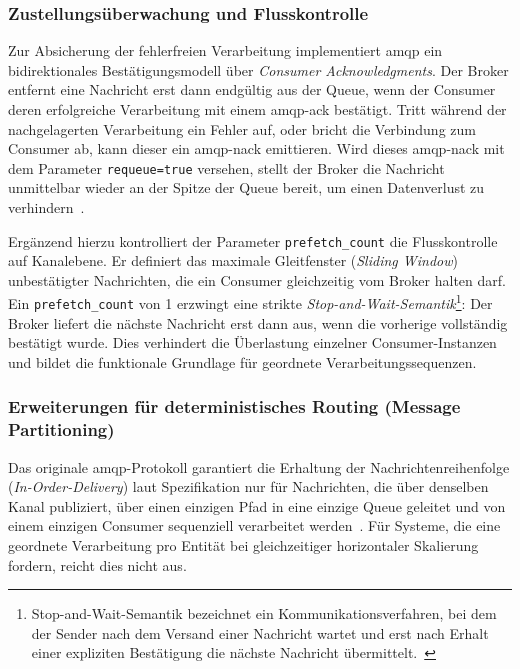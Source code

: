 \subsubsection{Zustellungsüberwachung und Flusskontrolle}

Zur Absicherung der fehlerfreien Verarbeitung implementiert \gls{amqp} ein bidirektionales Bestätigungsmodell über \textit{Consumer Acknowledgments}. Der Broker entfernt eine Nachricht erst dann endgültig aus der Queue, wenn der Consumer deren erfolgreiche Verarbeitung mit einem \gls{amqp}-\gls{ack} bestätigt. Tritt während der nachgelagerten Verarbeitung ein Fehler auf, oder bricht die Verbindung zum Consumer ab, kann dieser ein \gls{amqp}-\gls{nack} emittieren. Wird dieses \gls{amqp}-\gls{nack} mit dem Parameter \texttt{requeue=true} versehen, %
stellt der Broker die Nachricht unmittelbar wieder an der Spitze der Queue bereit, um einen Datenverlust zu verhindern~\citep{oasis2012amqp10}.

Ergänzend hierzu kontrolliert der Parameter \texttt{prefetch\_count} die Flusskontrolle auf Kanalebene. Er definiert das maximale Gleitfenster (\textit{Sliding Window}) unbestätigter Nachrichten, die ein Consumer gleichzeitig vom Broker halten darf. Ein \texttt{prefetch\_count} von 1 erzwingt eine strikte \textit{Stop-and-Wait-Semantik}\footnote{Stop-and-Wait-Semantik bezeichnet ein Kommunikationsverfahren, bei dem der Sender nach dem Versand einer Nachricht wartet und erst nach Erhalt einer expliziten Bestätigung die nächste Nachricht übermittelt.~\citep{tanenbaum2011computer}}: Der Broker liefert die nächste Nachricht erst dann aus, wenn die vorherige vollständig bestätigt wurde. Dies verhindert die Überlastung einzelner Consumer-Instanzen und bildet die funktionale Grundlage für geordnete Verarbeitungssequenzen.

\subsubsection*{Erweiterungen für deterministisches Routing (Message Partitioning)}
Das originale \gls{amqp}-Protokoll garantiert die Erhaltung der Nachrichtenreihenfolge (\textit{In-Order-Delivery}) laut Spezifikation nur für Nachrichten, die über denselben Kanal publiziert, über einen einzigen Pfad in eine einzige Queue geleitet und von einem einzigen Consumer sequenziell verarbeitet werden~\citep{oasis2012amqp10}. Für Systeme, die eine geordnete Verarbeitung pro Entität bei gleichzeitiger horizontaler Skalierung fordern, reicht dies nicht aus.

